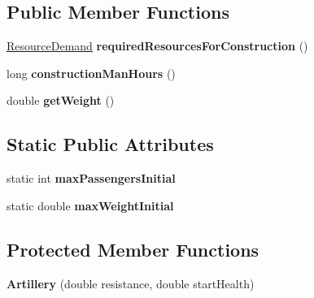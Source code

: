 \subsection*{Public Member Functions}
\begin{DoxyCompactItemize}
\item 
\hyperlink{classuniverse_1_1_resource_demand}{Resource\+Demand} {\bfseries required\+Resources\+For\+Construction} ()\hypertarget{classtools_1_1vehicles_1_1land_1_1_artillery_ac07b7bffd1639e5087508aaff7d577e1}{}\label{classtools_1_1vehicles_1_1land_1_1_artillery_ac07b7bffd1639e5087508aaff7d577e1}

\item 
long {\bfseries construction\+Man\+Hours} ()\hypertarget{classtools_1_1vehicles_1_1land_1_1_artillery_ac276231e5265b1e1000d88310740b3ee}{}\label{classtools_1_1vehicles_1_1land_1_1_artillery_ac276231e5265b1e1000d88310740b3ee}

\item 
double {\bfseries get\+Weight} ()\hypertarget{classtools_1_1vehicles_1_1land_1_1_artillery_a6cc95e34dc2bbd13a1236bb2f87751b8}{}\label{classtools_1_1vehicles_1_1land_1_1_artillery_a6cc95e34dc2bbd13a1236bb2f87751b8}

\end{DoxyCompactItemize}
\subsection*{Static Public Attributes}
\begin{DoxyCompactItemize}
\item 
static int {\bfseries max\+Passengers\+Initial}\hypertarget{classtools_1_1vehicles_1_1land_1_1_artillery_a2bd37f0cc8cd03c58bc1291c69c493ff}{}\label{classtools_1_1vehicles_1_1land_1_1_artillery_a2bd37f0cc8cd03c58bc1291c69c493ff}

\item 
static double {\bfseries max\+Weight\+Initial}\hypertarget{classtools_1_1vehicles_1_1land_1_1_artillery_ab1c660ca877c4e14beabbe6cf38ef150}{}\label{classtools_1_1vehicles_1_1land_1_1_artillery_ab1c660ca877c4e14beabbe6cf38ef150}

\end{DoxyCompactItemize}
\subsection*{Protected Member Functions}
\begin{DoxyCompactItemize}
\item 
{\bfseries Artillery} (double resistance, double start\+Health)\hypertarget{classtools_1_1vehicles_1_1land_1_1_artillery_a9a9eb7cbf7b397c24a3b9ce665cc4543}{}\label{classtools_1_1vehicles_1_1land_1_1_artillery_a9a9eb7cbf7b397c24a3b9ce665cc4543}

\end{DoxyCompactItemize}
